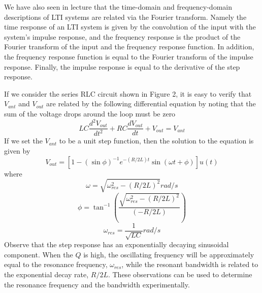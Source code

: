 \documentclass [utf8] {article}
\begin{document}
{	We have also seen in lecture that the time-domain and frequency-domain descriptions of LTI systems are related via the Fourier transform. Namely the time response of an LTI system is given by the convolution of the input with the system’s impulse response, and the frequency response is the product of the Fourier transform of the input and the frequency response function. In addition, the frequency response function is equal to the Fourier transform of the impulse response. Finally, the impulse response is equal to the derivative of the step response.

	If we consider the series RLC circuit shown in Figure 2, it is easy to verify that $V_{ant}$ and $V_{out}$ are related by the following differential equation by noting that the sum of the voltage drops around the loop must be zero
	$$LC\frac{d^2V_{out}}{dt^2}+RC\frac{dV_{out}}{dt}+V_{out} = V_{ant}$$
	If we set the $V_{ant}$ to be a unit step function, then the solution to the equation is given by
	$$V_{out} = [1-(\sin\phi)^{-1}e^{-(R/2L)t}\sin(\omega t+\phi)]u(t)$$
	where
	$$\omega = \sqrt{\omega_{res}^2-(R/2L)^2}rad/s$$
	$$\phi = \tan^{-1}(\frac{\sqrt{\omega_{res}^2-(R/2L)^2}}{(-R/2L)})$$
	$$\omega_{res} = \frac{1}{\sqrt{LC}}rad/s$$
	Observe that the step response has an exponentially decaying sinusoidal component. When the $Q$ is high, the oscillating frequency will be approximately equal to the resonance frequency, $\omega_{res}$, while the resonant bandwidth is related to the exponential decay rate, $R/2L$. These observations can be used to determine the resonance frequency and the bandwidth experimentally.
}
\end{document}

